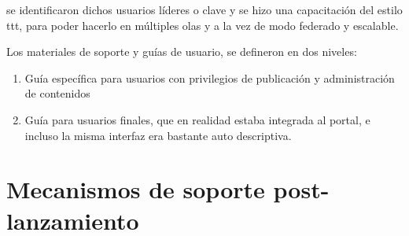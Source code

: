 se identificaron dichos usuarios líderes o clave y se hizo una capacitación del estilo \gls{ttt}, para poder hacerlo en múltiples olas y a la vez de modo federado y escalable.

Los materiales de soporte y guías de usuario, se defineron en dos niveles: 
\begin{enumerate}
    \item Guía específica para usuarios con privilegios de publicación y administración de contenidos
    \item Guía para usuarios finales, que en realidad estaba integrada al portal, e incluso la misma interfaz era bastante auto descriptiva.
\end{enumerate}

\section{Mecanismos de soporte post-lanzamiento}


